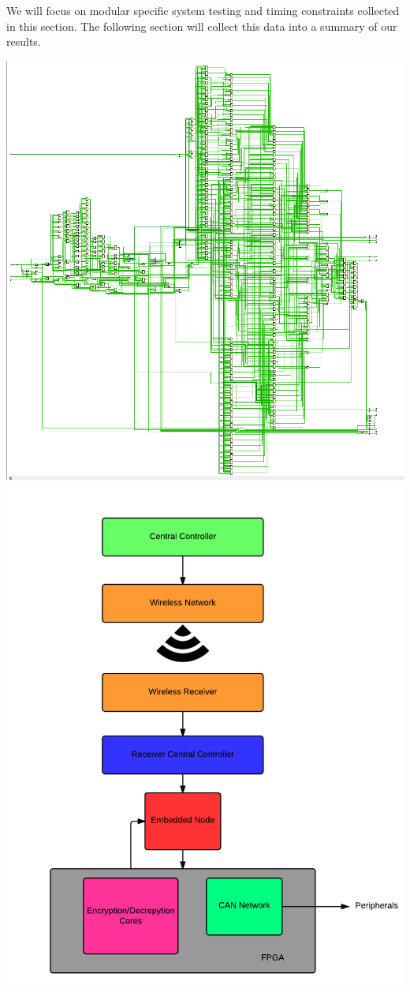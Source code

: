 \documentclass[a0,landscape]{a0poster}
\begin{document}
\begin{multicols}{3}
We will focus on modular specific system testing and timing constraints collected in this section. The following section will collect this data into a summary of our results.

\begin{vwcol}[widths={0.4,0.6}]
\includegraphics[scale=0.5]{fpga_synth1}
\includegraphics[scale=1.1]{design_flow}

\end{vwcol}
\end{multicols}
\end{document}
